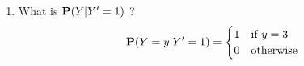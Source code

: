 {\begin{classwork}
\begin{enumerate}
\[\begin{array}{c c c c}
\p(Y \in \{0,1,2,3\} | Y'=0) & \frac{\sum_{y=0}^3{\p(Y=y,Y'=0)}}{\p(Y'=0)} & \frac {\frac{1}{8}+\frac{1}{8}+\frac{1}{8}+\frac{1}{8}+\frac{1}{8}+\frac{1}{8}+\frac{1}{8}}{\frac{1}{8}+\frac{1}{8}+\frac{1}{8}+\frac{1}{8}+\frac{1}{8}+\frac{1}{8}+\frac{1}{8}} & 1 \\ \hline
 \end{array}
 \]
\item What is $\mathbf{P}(Y|Y'=1)$ ?
 \[
\mathbf{P}(Y=y | Y'=1) = 
\begin{cases}
1 & \text{if $y=3$} \\
0 & \text{otherwise}
 \end{cases}
 \]
 \end{enumerate}
 \end{classwork}

}

